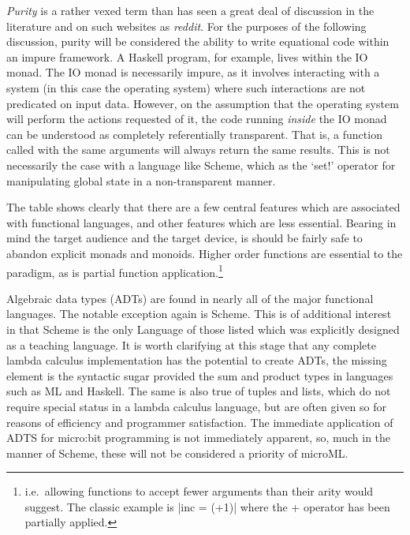 \documentclass[12pt, a4paper]{report}
\begin{document}
\textit{Purity} is a rather vexed term than has seen a great deal of discussion in the literature
and on such websites as \textit{reddit}. For the purposes of the following discussion, purity will
be considered the ability to write equational code within an impure framework. A Haskell program,
for example, lives within the IO monad. The IO monad is necessarily impure, as it involves
interacting with a system (in this case the operating system) where such interactions are not
predicated on input data. However, on the assumption that the operating system will perform the
actions requested of it, the code running \textit{inside} the IO monad can be understood as
completely referentially transparent. That is, a function called with the same arguments will always
return the same results. This is not necessarily the case with a language like Scheme, which as the
`set!' operator for manipulating global state in a non-transparent manner. 

The table shows clearly that there are a few central features which are associated with functional
languages, and other features which are less essential. Bearing in mind the target audience and the
target device, is should be fairly safe to abandon explicit monads and monoids. Higher order functions are
essential to the paradigm, as is partial function application.\footnote{i.e.\ allowing functions to
    accept fewer arguments than their arity would suggest. The classic example is |inc = (+1)| where
    the + operator has been partially applied.}

Algebraic data types (ADTs) are found in nearly all of the major functional languages. The notable
exception again is Scheme. This is of additional interest in that Scheme is the only Language of
those listed which was explicitly designed as a teaching language. It is worth clarifying at this
stage that any complete lambda calculus implementation has the potential to create ADTs, the missing
element is the syntactic sugar provided the sum and product types in languages such as ML and
Haskell. The same is also true of tuples and lists, which do not require special status in a
lambda calculus language, but are often given so for reasons of efficiency and programmer
satisfaction. The immediate application of ADTS for  micro:bit programming is not immediately
apparent, so, much in the manner of Scheme, these will not be considered a priority of microML.
\end{document}
